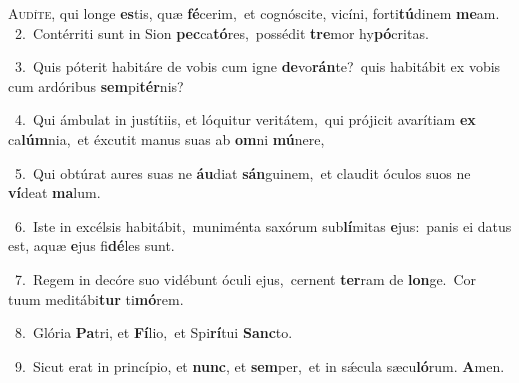 \lettrine{\initial\textcolor{\initialcolor}{A}}{udíte,} qui longe \textbf{es}\-tis, quæ \textbf{fé}\-cerim,~\star et cognóscite, vicíni, forti\-\textbf{tú}\-dinem \textbf{me}\-am.\\
{\numbfont\textcolor{\numbcolor}{~2.}}~Contérriti sunt in Sion \textbf{pec}\-ca\-\textbf{tó}\-res,~\star possédit \textbf{tre}\-mor hy\-\textbf{pó}\-critas.\par
{\numbfont\textcolor{\numbcolor}{~3.}}~Quis póterit habitáre de vobis cum igne \textbf{de}\-vo\-\textbf{rán}\-te?~\star quis habitábit ex vobis cum ardóribus \textbf{sem}\-pi\-\textbf{tér}\-nis?\par
{\numbfont\textcolor{\numbcolor}{~4.}}~Qui ámbulat in justítiis, et lóquitur veritátem,~\dagger qui prójicit avarítiam \textbf{ex} ca\-\textbf{lúm}\-nia,~\star et éxcutit manus suas ab \textbf{om}\-ni \textbf{mú}\-nere,\par
{\numbfont\textcolor{\numbcolor}{~5.}}~Qui obtúrat aures suas ne \textbf{áu}\-diat \textbf{sán}\-guinem,~\star et claudit óculos suos ne \textbf{ví}\-deat \textbf{ma}\-lum.\par
{\numbfont\textcolor{\numbcolor}{~6.}}~Iste in excélsis habitábit,~\dagger muniménta saxórum sub\-\textbf{lí}\-mitas \textbf{e}\-jus:~\star panis ei datus est, aquæ \textbf{e}\-jus fi\-\textbf{dé}\-les sunt.\par
{\numbfont\textcolor{\numbcolor}{~7.}}~Regem in decóre suo vidébunt óculi ejus,~\dagger cernent \textbf{ter}\-ram de \textbf{lon}\-ge.~\star Cor tuum meditábi\textbf{tur} ti\-\textbf{mó}\-rem.\par
{\numbfont\textcolor{\numbcolor}{~8.}}~Glória \textbf{Pa}\-tri, et \textbf{Fí}\-lio,~\star et Spi\-\textbf{rí}\-tui \textbf{Sanc}\-to.\par
{\numbfont\textcolor{\numbcolor}{~9.}}~Sicut erat in princípio, et \textbf{nunc}\-, et \textbf{sem}\-per,~\star et in sǽcula sæcu\-\textbf{ló}\-rum. \textbf{A}\-men.\par
